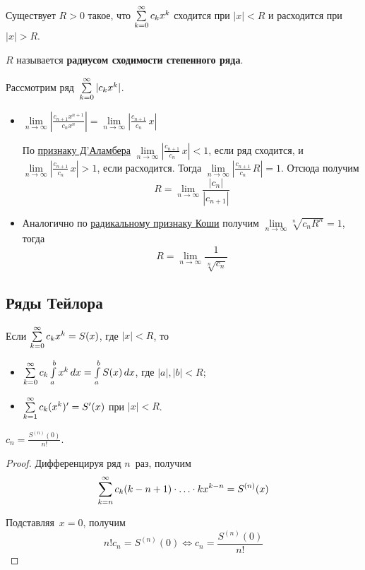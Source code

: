 \begin{consequent}
Существует $R > 0$ такое, что $\series[0] c_k x^k$ сходится при $|x| < R$ и расходится при $|x| > R$.
\end{consequent}

$R$ называется \textbf{радиусом сходимости степенного ряда}.

Рассмотрим ряд~$\series[0] |c_k x^k|$.
\begin{itemize}
	\item $\lim\limits_{n \to \infty} \left| \frac{c_{n+1} x^{n+1}}{c_n x^n} \right| =
	\lim\limits_{n \to \infty} \left| \frac{c_{n+1}}{c_n}\,x \right|$
	
	По \hyperref[th:d'Alembert's_ratio_test]{признаку Д'Аламбера} $\lim\limits_{n \to \infty} \left| \frac{c_{n+1}}{c_n}\,x \right| < 1$, если ряд сходится, и $\lim\limits_{n \to \infty} \left| \frac{c_{n+1}}{c_n}\,x \right| > 1$, если расходится.
	Тогда $\lim\limits_{n \to \infty} \left| \frac{c_{n+1}}{c_n}\,R \right| = 1$.
	Отсюда получим
	\begin{equation*}
	R = \lim_{n \to \infty} \frac{|c_n|}{|c_{n+1}|}
	\end{equation*}
	
	\item Аналогично по \hyperref[th:Cauchy's_radical_test]{радикальному признаку Коши} получим $\lim\limits_{n \to \infty} \sqrt[n]{c_n R^n} = 1$, тогда
	\begin{equation*}
	R = \lim_{n \to \infty} \frac1{\sqrt[n]{c_n}}
	\end{equation*}
\end{itemize}

\subsection{Ряды Тейлора}
\begin{theorem}
Если $\series[0] c_k x^k = S(x)$, где $|x| < R$, то
\begin{itemize}
	\item $\series[0] c_k \int\limits_a^b x^k\,dx = \int\limits_a^b S(x)\,dx$, где $|a|, |b| < R$;
	\item $\series c_k (x^k)' = S'(x)$ при $|x| < R$.
\end{itemize}
\end{theorem}

\begin{consequent}
$c_n = \frac{S^{(n)}(0)}{n!}$.
\end{consequent}
\begin{proof}
Дифференцируя ряд $n$~раз, получим
\begin{equation*}
\series[n] c_k (k - n + 1) \cdot \ldots \cdot k x^{k-n} = S^{(n)}(x)
\end{equation*}

Подставляя~$x = 0$, получим
\begin{equation*}
n! c_n = S^{(n)}(0) \Leftrightarrow
c_n = \frac{S^{(n)}(0)}{n!}
\end{equation*}
\end{proof}

